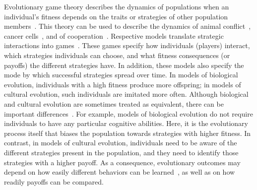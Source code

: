\documentclass[11pt]{article}
\theoremstyle{plainCl1}
\theoremstyle{plainCl2}
\begin{document}
Evolutionary game theory describes the dynamics of populations when an individual's fitness depends on the traits or strategies of other population members~\cite{hofbauer1998evolutionary, nowak:Nature:2004, hauert2005game,Traulsen:PhilTrans:2022}.  
This theory can be used to describe the dynamics of animal conflict~\citep{maynard-smith:Nature:1973}, cancer cells~\citep{Stein:PTRS:2023}, and of cooperation~\citep{nowak:Science:2006}. 
Respective models translate strategic interactions into games~\cite{smith1982evolution}. 
These games specify how individuals (players) interact, which strategies individuals can choose, and what fitness consequences (or payoffs) the different strategies have. 
In addition, these models also specify the mode by which successful strategies spread over time. 
In models of biological evolution, individuals with a high fitness produce more offspring; in models of cultural evolution, such individuals are imitated more often. 
Although biological and cultural evolution are sometimes treated as equivalent, there can be important differences~\citep{Wu2015,Smolla:PTRS:2021,Denton:TPB:2022}. 
For example, models of biological evolution do not require individuals to have any particular cognitive abilities.
Here, it is the evolutionary process itself that biases the population towards strategies with higher fitness. 
In contrast, in models of cultural evolution, individuals need to be aware of the different strategies present in the population, and they need to identify those strategies with a higher payoff. 
As a consequence, evolutionary outcomes may depend on how easily different behaviors can be learned~\citep{Chatterjee:JTB:2012}, as well as on how readily payoffs can be compared.

\end{document}
